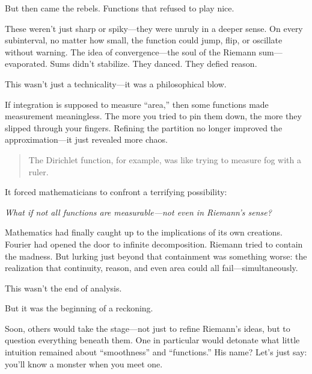 But then came the rebels. Functions that refused to play nice.

These weren’t just sharp or spiky—they were unruly in a deeper sense. On every subinterval, no matter how small, the function could jump, flip, or oscillate without warning. The idea of convergence—the soul of the Riemann sum—evaporated. Sums didn’t stabilize. They danced. They defied reason.

\medskip

This wasn’t just a technicality—it was a philosophical blow.

If integration is supposed to measure “area,” then some functions made measurement meaningless. The more you tried to pin them down, the more they slipped through your fingers. Refining the partition no longer improved the approximation—it just revealed more chaos.

\begin{quote}
The Dirichlet function, for example, was like trying to measure fog with a ruler.
\end{quote}

It forced mathematicians to confront a terrifying possibility:

\begin{center}
\emph{What if not all functions are measurable—not even in Riemann’s sense?}
\end{center}

Mathematics had finally caught up to the implications of its own creations. Fourier had opened the door to infinite decomposition. Riemann tried to contain the madness. But lurking just beyond that containment was something worse: the realization that continuity, reason, and even area could all fail—simultaneously.

\medskip

This wasn’t the end of analysis.

But it was the beginning of a reckoning.

Soon, others would take the stage—not just to refine Riemann’s ideas, but to question everything beneath them. One in particular would detonate what little intuition remained about “smoothness” and “functions.” His name? Let’s just say: you’ll know a monster when you meet one.
